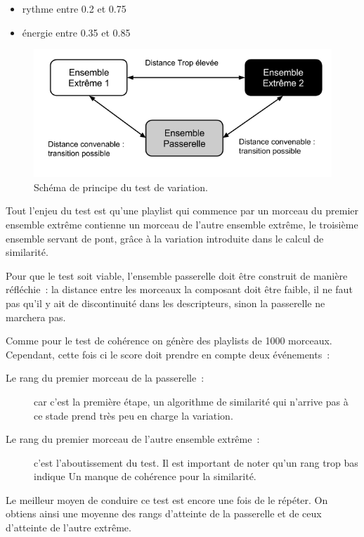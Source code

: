 \begin{itemize}
  \item rythme entre 0.2 et 0.75
  \item énergie entre 0.35 et 0.85
\end{itemize}

\begin{figure}[h]
\includegraphics[width=\textwidth]{data/tests/test-variation-passerelle.png}
\caption{Schéma de principe du test de variation.}
\end{figure}

Tout l'enjeu du test est qu'une playlist qui commence par un morceau du premier
ensemble extrême contienne un morceau de l'autre ensemble extrême, le troisième
ensemble servant de pont, grâce à la variation introduite dans le calcul de
similarité.

Pour que le test soit viable, l'ensemble passerelle doit être construit de
manière réfléchie~: la distance entre les morceaux la composant doit être faible,
il ne faut pas qu'il y ait de discontinuité dans les descripteurs, sinon la
passerelle ne marchera pas.

Comme pour le test de cohérence on génère des playlists de 1000 morceaux.
Cependant, cette fois ci le score doit prendre en compte deux événements~:
\begin{description}
  \item[Le rang du premier morceau de la passerelle~:] car c'est la première
  étape, un algorithme de similarité qui n'arrive pas à ce stade prend très peu
  en charge la variation.
  \item[Le rang du premier morceau de l'autre ensemble extrême~:] c'est
  l'aboutissement du test. Il est important de noter qu'un rang trop bas indique
  Un manque de cohérence pour la similarité.
\end{description}

Le meilleur moyen de conduire ce test est encore une fois de le répéter. On
obtiens ainsi une moyenne des rangs d'atteinte de la passerelle et de ceux
d'atteinte de l'autre extrême.